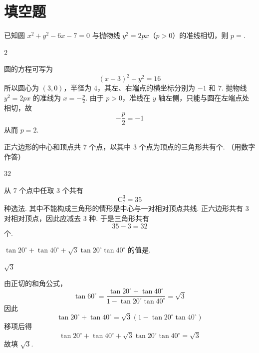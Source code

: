 \documentclass[UTF8,a4paper,oneside,11pt]{ctexbook}
\begin{document}
\section{填空题}

\begin{problem}
已知圆 \(x^{2} + y^{2} - 6x - 7 = 0\) 与抛物线 \(y^{2} = 2px\)（\(p > 0\)）的准线相切，则 \(p =\)\fillinblank{}.
\end{problem}

\begin{answer}
\(2\)
\end{answer}

\begin{solution}
圆的方程可写为
\[
(x-3)^2+y^2=16
\]
所以圆心为 \((3,0)\)，半径为 \(4\)，其左、右端点的横坐标分别为 \(-1\) 和 \(7\). 抛物线 \(y^2=2px\) 的准线为 \(x=-\frac p2\). 由于 \(p>0\)，准线在 \(y\) 轴左侧，只能与圆在左端点处相切，故
\[
-\frac p2=-1
\]
从而 \(p=2\).
\end{solution}

\begin{problem}
正六边形的中心和顶点共 \(7\) 个点，以其中 \(3\) 个点为顶点的三角形共有\fillinblank{}个. （用数字作答）
\end{problem}

\begin{answer}
\(32\)
\end{answer}

\begin{solution}
从 \(7\) 个点中任取 \(3\) 个共有
\[
\mathrm C_7^3=35
\]
种选法. 其中不能构成三角形的情形是中心与一对相对顶点共线. 正六边形共有 \(3\) 对相对顶点，因此应减去 \(3\) 种. 于是三角形共有
\[
35-3=32
\]
个.
\end{solution}

\begin{problem}
\(\tan 20^{\circ} + \tan 40^{\circ} + \sqrt{3}\tan 20^{\circ}\tan 40^{\circ}\) 的值是\fillinblank{}.
\end{problem}

\begin{answer}
\(\sqrt{3}\)
\end{answer}

\begin{solution}
由正切的和角公式，
\[
\tan60^{\circ}
=\frac{\tan20^{\circ}+\tan40^{\circ}}
{1-\tan20^{\circ}\tan40^{\circ}}
=\sqrt3
\]
因此
\[
\tan20^{\circ}+\tan40^{\circ}
=\sqrt3\left(1-\tan20^{\circ}\tan40^{\circ}\right)
\]
移项后得
\[
\tan20^{\circ}+\tan40^{\circ}
+\sqrt3\tan20^{\circ}\tan40^{\circ}=\sqrt3
\]
故填 \(\sqrt3\).
\end{solution}
\end{document}
